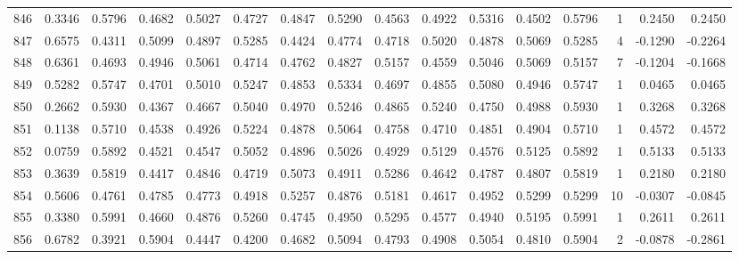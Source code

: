 \begin{tabular}{lrrrrrrrrrrrrrrr}
846 &      0.3346 &  0.5796 &  0.4682 &  0.5027 &  0.4727 &  0.4847 &  0.5290 &  0.4563 &  0.4922 &  0.5316 &   0.4502 &     0.5796 &      1 &                    0.2450 &                     0.2450 \\
847 &      0.6575 &  0.4311 &  0.5099 &  0.4897 &  0.5285 &  0.4424 &  0.4774 &  0.4718 &  0.5020 &  0.4878 &   0.5069 &     0.5285 &      4 &                   -0.1290 &                    -0.2264 \\
848 &      0.6361 &  0.4693 &  0.4946 &  0.5061 &  0.4714 &  0.4762 &  0.4827 &  0.5157 &  0.4559 &  0.5046 &   0.5069 &     0.5157 &      7 &                   -0.1204 &                    -0.1668 \\
849 &      0.5282 &  0.5747 &  0.4701 &  0.5010 &  0.5247 &  0.4853 &  0.5334 &  0.4697 &  0.4855 &  0.5080 &   0.4946 &     0.5747 &      1 &                    0.0465 &                     0.0465 \\
850 &      0.2662 &  0.5930 &  0.4367 &  0.4667 &  0.5040 &  0.4970 &  0.5246 &  0.4865 &  0.5240 &  0.4750 &   0.4988 &     0.5930 &      1 &                    0.3268 &                     0.3268 \\
851 &      0.1138 &  0.5710 &  0.4538 &  0.4926 &  0.5224 &  0.4878 &  0.5064 &  0.4758 &  0.4710 &  0.4851 &   0.4904 &     0.5710 &      1 &                    0.4572 &                     0.4572 \\
852 &      0.0759 &  0.5892 &  0.4521 &  0.4547 &  0.5052 &  0.4896 &  0.5026 &  0.4929 &  0.5129 &  0.4576 &   0.5125 &     0.5892 &      1 &                    0.5133 &                     0.5133 \\
853 &      0.3639 &  0.5819 &  0.4417 &  0.4846 &  0.4719 &  0.5073 &  0.4911 &  0.5286 &  0.4642 &  0.4787 &   0.4807 &     0.5819 &      1 &                    0.2180 &                     0.2180 \\
854 &      0.5606 &  0.4761 &  0.4785 &  0.4773 &  0.4918 &  0.5257 &  0.4876 &  0.5181 &  0.4617 &  0.4952 &   0.5299 &     0.5299 &     10 &                   -0.0307 &                    -0.0845 \\
855 &      0.3380 &  0.5991 &  0.4660 &  0.4876 &  0.5260 &  0.4745 &  0.4950 &  0.5295 &  0.4577 &  0.4940 &   0.5195 &     0.5991 &      1 &                    0.2611 &                     0.2611 \\
856 &      0.6782 &  0.3921 &  0.5904 &  0.4447 &  0.4200 &  0.4682 &  0.5094 &  0.4793 &  0.4908 &  0.5054 &   0.4810 &     0.5904 &      2 &                   -0.0878 &                    -0.2861 \\

\end{tabular}
